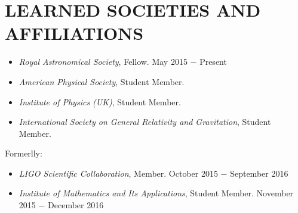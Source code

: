 \section{LEARNED SOCIETIES AND AFFILIATIONS}

\begin{itemize}
\item {\sl Royal Astronomical Society}, Fellow. \hfill May 2015 $-$ Present \\
\item {\sl American Physical Society}, Student Member. \hfill \\
\item {\sl Institute of Physics (UK)}, Student Member. \hfill  \\
\item {\sl International Society on General Relativity and Gravitation}, Student Member. \hfill \\
\end{itemize}
Formerlly: \\
\begin{itemize}
\item {\sl LIGO Scientific Collaboration}, Member. \hfill October 2015 $-$ September 2016 \\
\item {\sl Institute of Mathematics and Its Applications}, Student Member. \hfill November 2015 $-$ December 2016\\
\end{itemize}